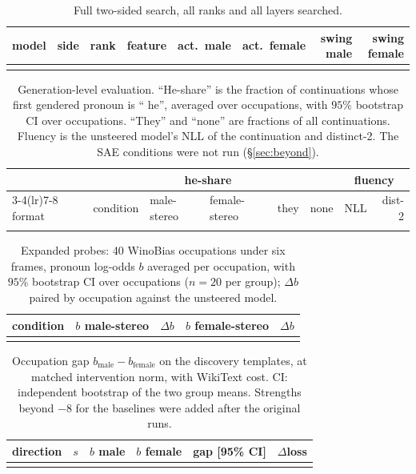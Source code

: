\documentclass{article}
\begin{document}
\begin{table}[h]
\centering
\caption{Full two-sided search, all ranks and all layers searched.}
\label{tab:searchfull}
\scriptsize
\setlength{\tabcolsep}{3pt}
\begin{tabular}{llrlrrrr}
\toprule
model & side & rank & feature & act.\ male & act.\ female & swing male & swing female \\
\midrule
 \\
\bottomrule
\end{tabular}
\end{table}


\begin{table}[h]
\centering
\caption{Generation-level evaluation. ``He-share'' is the fraction of continuations whose
first gendered pronoun is `` he'', averaged over occupations, with $95\%$ bootstrap CI over
occupations. ``They'' and ``none'' are fractions of all continuations. Fluency is the
unsteered model's NLL of the continuation and distinct-2. The SAE conditions were not
run (\S\ref{sec:beyond}).}
\label{tab:generation}
\scriptsize
\setlength{\tabcolsep}{3pt}
\begin{tabular}{llllrrrr}
\toprule
& & \multicolumn{2}{c}{he-share} & & & \multicolumn{2}{c}{fluency} \\
\cmidrule(lr){3-4}\cmidrule(lr){7-8}
format & condition & male-stereo & female-stereo & they & none & NLL & dist-2 \\
\midrule
 \\
\bottomrule
\end{tabular}
\end{table}

\begin{table}[h]
\centering
\caption{Expanded probes: 40 WinoBias occupations under six frames, pronoun log-odds $b$
averaged per occupation, with $95\%$ bootstrap CI over occupations ($n=20$ per group);
$\Delta b$ paired by occupation against the unsteered model.}
\label{tab:expanded}
\scriptsize
\setlength{\tabcolsep}{3pt}
\begin{tabular}{lllll}
\toprule
condition & $b$ male-stereo & $\Delta b$ & $b$ female-stereo & $\Delta b$ \\
\midrule
 \\
\bottomrule
\end{tabular}
\end{table}

\begin{table}[h]
\centering
\caption{Occupation gap $b_{\text{male}}-b_{\text{female}}$ on the discovery templates, at
matched intervention norm, with WikiText cost. CI: independent bootstrap of the two group
means. Strengths beyond $-8$ for the baselines were added after the original runs.}
\label{tab:gap}
\small
\begin{tabular}{llrrlr}
\toprule
direction & $s$ & $b$ male & $b$ female & gap [95\% CI] & $\Delta$loss \\
\midrule
 \\
\bottomrule
\end{tabular}
\end{table}
\end{document}
